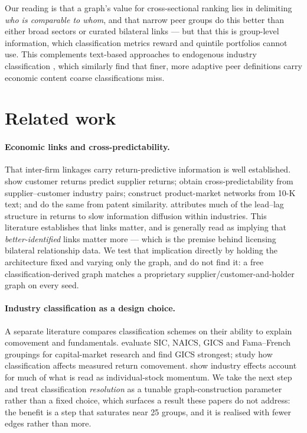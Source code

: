 \documentclass[11pt]{airesearch}
\begin{document}
Our reading is that a graph's value for cross-sectional ranking lies in
delimiting \emph{who is comparable to whom}, and that narrow peer groups do
this better than either broad sectors or curated bilateral links --- but that
this is group-level information, which classification metrics reward and
quintile portfolios cannot use. This complements text-based approaches to
endogenous industry classification \citep{hoberg2016text}, which similarly find
that finer, more adaptive peer definitions carry economic content coarse
classifications miss.

\section{Related work}

\paragraph{Economic links and cross-predictability.} That inter-firm linkages
carry return-predictive information is well established.
\citet{cohen2008economic} show customer returns predict supplier returns;
\citet{menzly2010market} obtain cross-predictability from supplier--customer
industry pairs; \citet{hoberg2016text} construct product-market networks from
10-K text; and \citet{lee2019technological} do the same from patent
similarity. \citet{hou2007industry} attributes much of the lead--lag structure
in returns to slow information diffusion within industries. This literature
establishes that links matter, and is generally read as implying that
\emph{better-identified} links matter more --- which is the premise behind
licensing bilateral relationship data. We test that implication directly by
holding the architecture fixed and varying only the graph, and do not find it:
a free classification-derived graph matches a proprietary
supplier/customer-and-holder graph on every seed.

\paragraph{Industry classification as a design choice.} A separate literature
compares classification schemes on their ability to explain comovement and
fundamentals. \citet{bhojraj2003whats} evaluate SIC, NAICS, GICS and
Fama--French groupings for capital-market research and find GICS strongest;
\citet{chan2007industry} study how classification affects measured return
comovement. \citet{moskowitz1999industries} show industry effects account for
much of what is read as individual-stock momentum. We take the next step and
treat classification \emph{resolution} as a tunable graph-construction
parameter rather than a fixed choice, which surfaces a result these papers do
not address: the benefit is a step that saturates near 25 groups, and it is
realised with fewer edges rather than more.
\end{document}
